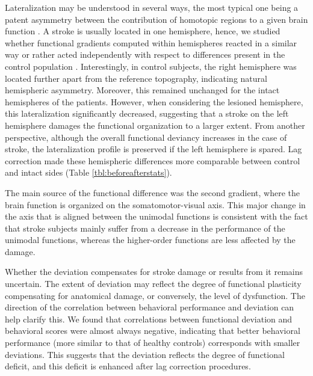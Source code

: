 \documentclass[fleqn,10pt]{wlscirep}
\begin{document}
Lateralization may be understood in several ways, the most typical one being a patent asymmetry between the contribution of homotopic regions to a given brain function \citep{xu2024lateralization}. A stroke is usually located in one hemisphere, hence, we studied whether functional gradients computed within hemispheres reacted in a similar way or rather acted independently with respect to differences present in the control population \citep{new2015altered,yourganov2021effect, tang2016decreased, urbin2014resting}.  Interestingly, in control subjects, the right hemisphere was located further apart from the reference topography, indicating natural hemispheric asymmetry. Moreover, this remained unchanged for the intact hemispheres of the patients. However, when considering the lesioned hemisphere, this lateralization significantly decreased, suggesting that a stroke on the left hemisphere damages the functional organization to a larger extent. From another perspective, although the overall functional deviancy increases in the case of stroke, the lateralization profile is preserved if the left hemisphere is spared. Lag correction made these hemispheric differences more comparable between control and intact sides (Table \ref{tbl:beforeafterstats}).

The main source of the functional difference was the second gradient, where the brain function is organized on the somatomotor-visual axis. This major change in the axis that is aligned between the unimodal functions is consistent with the fact that stroke subjects mainly suffer from a decrease in the performance of the unimodal functions, whereas the higher-order functions are less affected by the damage. 

Whether the deviation compensates for stroke damage or results from it remains uncertain. The extent of deviation may reflect the degree of functional plasticity compensating for anatomical damage, or conversely, the level of dysfunction. The direction of the correlation between behavioral performance and deviation can help clarify this. We found that correlations between functional deviation and behavioral scores were almost always negative, indicating that better behavioral performance (more similar to that of healthy controls) corresponds with smaller deviations. This suggests that the deviation reflects the degree of functional deficit, and this deficit is enhanced after lag correction procedures.
\end{document}
